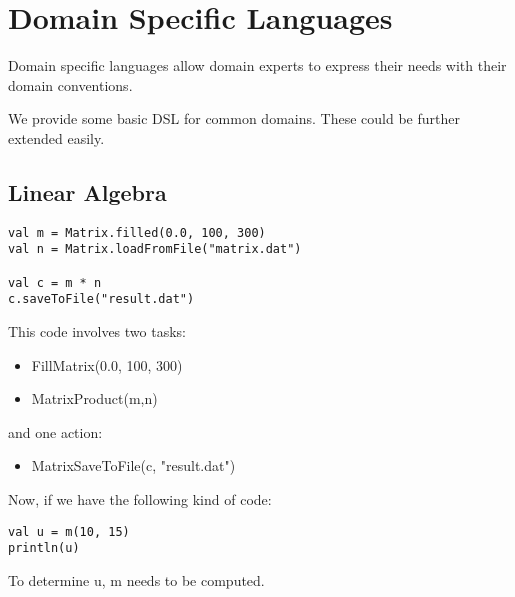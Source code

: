 \chapter{Domain Specific Languages}

Domain specific languages allow domain experts to express their needs with their domain conventions.

We provide some basic DSL for common domains.
These could be further extended easily.

\section{Linear Algebra}

\begin{lstlisting}
val m = Matrix.filled(0.0, 100, 300)
val n = Matrix.loadFromFile("matrix.dat")

val c = m * n
c.saveToFile("result.dat")
\end{lstlisting}

This code involves two tasks:
\begin{itemize}
  \item FillMatrix(0.0, 100, 300)
  \item MatrixProduct(m,n)
\end{itemize}
and one action:
\begin{itemize}
  \item MatrixSaveToFile(c, "result.dat")
\end{itemize}


Now, if we have the following kind of code:
\begin{lstlisting}
val u = m(10, 15)
println(u)
\end{lstlisting}

To determine u, m needs to be computed.
